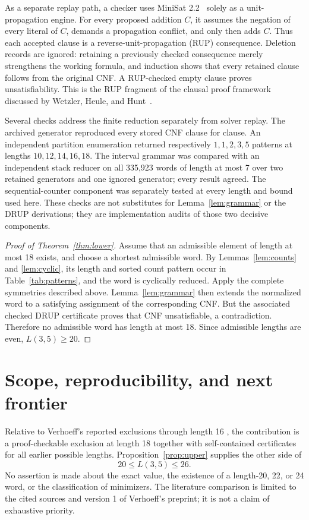 \documentclass[11pt]{article}
\begin{document}
As a separate replay path, a checker uses MiniSat
2.2~\cite{EenSorensson2003} solely as a unit-propagation engine.  For every
proposed addition \(C\), it assumes the negation of every literal of \(C\),
demands a propagation conflict, and only then adds \(C\).  Thus each accepted
clause is a reverse-unit-propagation (RUP) consequence.  Deletion records are
ignored: retaining a previously checked consequence merely strengthens the
working formula, and induction shows that every retained clause follows from
the original CNF.  A RUP-checked empty clause proves unsatisfiability.  This
is the RUP fragment of the clausal proof framework discussed by Wetzler,
Heule, and Hunt~\cite{WetzlerHeuleHunt2014}.

Several checks address the finite reduction separately from solver replay.
The archived generator reproduced every stored CNF clause for clause.  An
independent partition enumeration returned respectively \(1,1,2,3,5\)
patterns at lengths \(10,12,14,16,18\).  The interval grammar was compared
with an independent stack reducer on all 335,923 words of length at most 7
over two retained generators and one ignored generator; every result agreed.
The sequential-counter component was separately tested at every length and
bound used here.  These checks are not substitutes for
Lemma~\ref{lem:grammar} or the DRUP derivations; they are implementation
audits of those two decisive components.

\begin{proof}[Proof of Theorem~\ref{thm:lower}]
Assume that an admissible element of length at most 18 exists, and choose a
shortest admissible word.  By Lemmas~\ref{lem:counts} and
\ref{lem:cyclic}, its length and sorted count pattern occur in
Table~\ref{tab:patterns}, and the word is cyclically reduced.  Apply the
complete symmetries described above.  Lemma~\ref{lem:grammar} then extends the
normalized word to a satisfying assignment of the corresponding CNF.  But
the associated checked DRUP certificate proves that CNF unsatisfiable, a
contradiction.  Therefore no admissible word has length at most 18.  Since
admissible lengths are even, \(L(3,5)\geq20\).
\end{proof}

\section{Scope, reproducibility, and next frontier}

Relative to Verhoeff's reported exclusions through length 16
\cite{Verhoeff2026}, the contribution is a proof-checkable exclusion at
length 18 together with self-contained certificates for all earlier possible
lengths.  Proposition~\ref{prop:upper} supplies the other side of
\[
20\leq L(3,5)\leq26.
\]
No assertion is made about the exact value, the existence of a length-20,
22, or 24 word, or the classification of minimizers.  The literature
comparison is limited to the cited sources and version 1 of Verhoeff's
preprint; it is not a claim of exhaustive priority.
\end{document}
